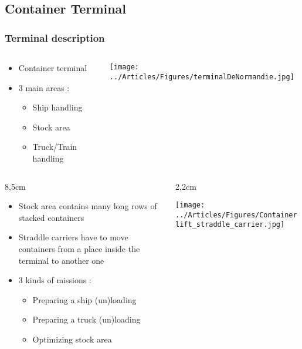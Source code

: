\documentclass{beamer}
\begin{document}
\subsection*{Container Terminal}
\begin{frame}
\frametitle{Terminal description}

 	\begin{columns}
 	 	\begin{column}[l]{6cm}
			\begin{itemize}
				\item Container terminal
				\item 3 main areas : 
				\begin{itemize}
 					\item Ship handling
					\item Stock area
					\item Truck/Train handling
				\end{itemize}
			\end{itemize}
		\end{column}
 	 	\begin{column}[r]{4.7cm}
			\begin{flushright}
				\texttt{[image: ../Articles/Figures/terminalDeNormandie.jpg]}
			\end{flushright}
		\end{column}
 	\end{columns}

	\begin{columns}
 	 	\begin{column}[l]{8,5cm}
 		\begin{itemize} 
\item Stock area contains many long rows of stacked containers		
\item Straddle carriers have to move containers from a place inside the terminal to another one
		\item 3 kinds of missions : 
			\begin{itemize}
				\item Preparing a ship (un)loading
				\item Preparing a truck (un)loading
				\item Optimizing stock area
			\end{itemize}
	\end{itemize}
	\end{column}
 	 	\begin{column}[r]{2,2cm}
			\begin{flushright}
			    \texttt{[image: ../Articles/Figures/Containerlift\_straddle\_carrier.jpg]}
			\end{flushright}
		\end{column}
 	\end{columns}

	
\end{frame}
\end{document}
